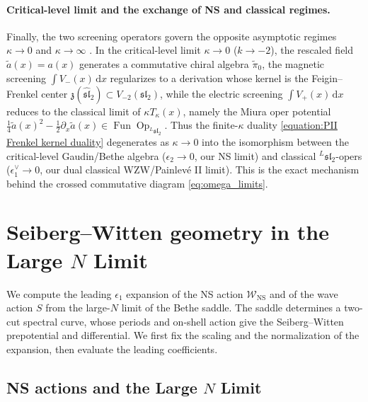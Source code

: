 \documentclass[a4paper,11pt]{article}
\newcommand{\dd}{\mathrm{d}}
\numberwithin{equation}{section}
\begin{document}
\paragraph{Critical-level limit and the exchange of NS and classical regimes.}
Finally, the two screening operators govern the opposite asymptotic regimes $\kappa\to 0$ and $\kappa\to\infty$ \cite[Section~8.5]{Frenkel2005LanglandsLectures}. In the critical-level limit $\kappa\to 0$ ($k\to -2$), the rescaled field $\tilde{a}(x)=a(x)$ generates a commutative chiral algebra $\tilde{\pi}_{0}$, the magnetic screening $\int V_{-}(x)\,\dd x$ regularizes to a derivation whose kernel is the Feigin--Frenkel center $\mathfrak{z}(\widehat{\mathfrak{sl}}_{2})\subset V_{-2}(\mathfrak{sl}_{2})$, while the electric screening $\int V_{+}(x)\,\dd x$ reduces to the classical limit of $\kappa T_{\kappa}(x)$, namely the Miura oper potential $\frac{1}{4}\tilde{a}(x)^{2}-\frac{1}{2}\partial_{x}\tilde{a}(x)\in\operatorname{Fun}\operatorname{Op}_{{}^{L}\mathfrak{sl}_{2}}$. Thus the finite-$\kappa$ duality \eqref{equation:PII Frenkel kernel duality} degenerates as $\kappa\to 0$ into the isomorphism between the critical-level Gaudin/Bethe algebra ($\epsilon_{2}\to 0$, our NS limit) and classical ${}^{L}\mathfrak{sl}_{2}$-opers ($\epsilon_{1}^{\vee}\to 0$, our dual classical WZW/Painlev\'e II limit). This is the exact mechanism behind the crossed commutative diagram \eqref{eq:omega_limits}.


\section{Seiberg--Witten geometry in the Large $N$ Limit}
\label{section:PII planar SW geometry}

We compute the leading $\epsilon_{1}$ expansion of the NS action
$\mathcal{W}_{\mathrm{NS}}$ and of the wave action $S$ from the
large-$N$ limit of the Bethe saddle.  The saddle determines a
two-cut spectral curve, whose periods and on-shell action give the
Seiberg--Witten prepotential and differential.  We first fix the
scaling and the normalization of the expansion, then evaluate the
leading coefficients.



\subsection{NS actions and the Large $N$ Limit}
\label{subsection:PII chapter7 Large Limit}
\end{document}
